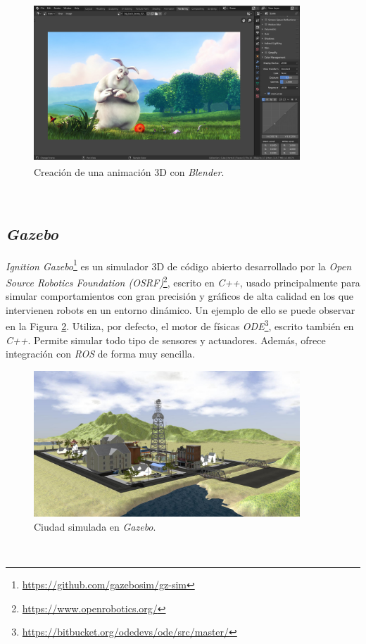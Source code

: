 \begin{figure} [h!]
	\begin{center}
		\includegraphics[width=10cm, height=6cm]{figs/blender}
	\end{center}
	\caption{Creación de una animación 3D con \textit{Blender}.}
	\label{fig:blender}
\end{figure}\

\subsection{\textit{Gazebo}}
\label{subsection:gazebo}
\textit{Ignition Gazebo}\footnote{\url{https://github.com/gazebosim/gz-sim}} es un simulador 3D de código abierto desarrollado por la \textit{Open Source Robotics Foundation (OSRF)}\footnote{\url{https://www.openrobotics.org/}}, escrito en \textit{C++}, usado principalmente para simular comportamientos con gran precisión y gráficos de alta calidad en los que intervienen robots en un entorno dinámico. Un ejemplo de ello se puede observar en la Figura \ref{fig:city}. Utiliza, por defecto, el motor de físicas \textit{ODE}\footnote{\url{https://bitbucket.org/odedevs/ode/src/master/}}, escrito también en \textit{C++}. Permite simular todo tipo de sensores y actuadores. Además, ofrece integración con \textit{ROS} de forma muy sencilla.\\

\begin{figure} [h!]
	\begin{center}
		\includegraphics[width=10cm]{figs/city}
	\end{center}
	\caption{Ciudad simulada en \textit{Gazebo}.}
	\label{fig:city}
\end{figure}\

